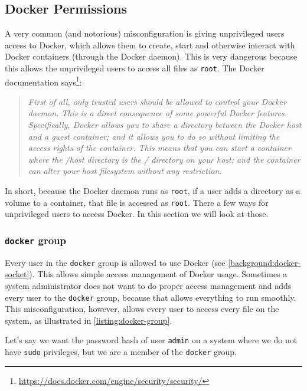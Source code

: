 \subsection{Docker Permissions}\label{subsection:docker-permissions}
A very common (and notorious) misconfiguration is giving unprivileged users access to Docker, which allows them to create, start and otherwise interact with Docker containers (through the Docker daemon). This is very dangerous because this allows the unprivileged users to access all files as \lstinline{root}. The Docker documentation says\footnote{\url{https://docs.docker.com/engine/security/security/}}:
\begin{quote}
\emph{First of all, only trusted users should be allowed to control your Docker daemon. This is a direct consequence of some powerful Docker features. Specifically, Docker allows you to share a directory between the Docker host and a guest container; and it allows you to do so without limiting the access rights of the container. This means that you can start a container where the /host directory is the / directory on your host; and the container can alter your host filesystem without any restriction}.
\end{quote}

In short, because the Docker daemon runs as \lstinline{root}, if a user adds a directory as a volume to a container, that file is accessed as \lstinline{root}. There a few ways for unprivileged users to access Docker. In this section we will look at those.

\subsubsection{\texorpdfstring{\lstinline{docker}}{docker} group}
Every user in the \lstinline{docker} group is allowed to use Docker (see \autoref{background:docker-socket}). This allows simple access management of Docker usage. Sometimes a system administrator does not want to do proper access management and adds every user to the \lstinline{docker} group, because that allows everything to run smoothly. This misconfiguration, however, allows every user to access every file on the system, as illustrated in \autoref{listing:docker-group}.

\medskip

Let's say we want the password hash of user \lstinline{admin} on a system where we do not have \lstinline{sudo} privileges, but we are a member of the \lstinline{docker} group.

